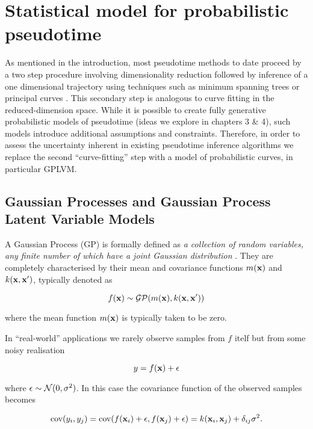 \section{Statistical model for probabilistic pseudotime}

As mentioned in the introduction, most pseudotime methods to date proceed by a two step procedure involving dimensionality reduction followed by inference of a one dimensional trajectory using techniques such as minimum spanning trees \cite{Trapnell2014-xi,Ji2016-gx} or principal curves \cite{Marco2014-ug,campbell2015laplacian,cannoodt2016scorpius}. This secondary step is analogous to curve fitting in the reduced-dimension space. While it is possible to create fully generative probabilistic models of pseudotime (ideas we explore in chapters 3 \& 4), such models introduce additional assumptions and constraints. Therefore, in order to assess the uncertainty inherent in existing pseudotime inference algorithms we replace the second ``curve-fitting'' step with a model of probabilistic curves, in particular GPLVM.

\subsection{Gaussian Processes and Gaussian Process Latent Variable Models}

A Gaussian Process (GP) is formally defined as \emph{a collection of random variables, any finite number of which have a joint Gaussian distribution} \cite{rasmussen2006gaussian}. They are completely characterised by their mean and covariance functions $m({\bf x})$ and $k({\bf x}, {\bf x}')$, typically denoted as

\begin{equation}
	f({\bf x}) \sim \mathcal{GP}(m({\bf x}), k({\bf x}, {\bf x}'))
\end{equation}

where the mean function $m({\bf x})$ is typically taken to be zero.

In ``real-world'' applications we rarely observe samples from $f$ itelf but from some noisy realisation

\begin{equation}
	y = f({\bf x}) + \epsilon
\end{equation}

where $\epsilon \sim \mathcal{N}(0, \sigma^2)$. In this case the covariance function of the observed samples becomes

\begin{equation}
	\text{cov}(y_i, y_j) = \text{cov}(f({\bf x}_i) + \epsilon, f({\bf x}_j) + \epsilon) = k({\bf x}_i, {\bf x}_j) + \delta_{ij} \sigma^2.
\end{equation}

